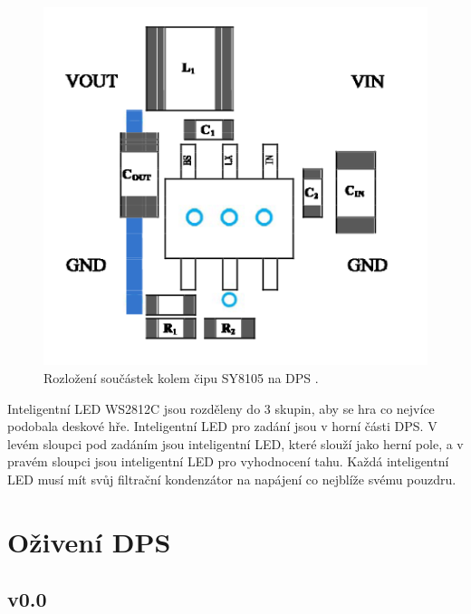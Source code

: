 \begin{figure}[!h]
  \begin{center}
    \includegraphics[scale=1]{obrazky/SY8105_rozlozeni_na_DPS.png}
  \end{center}
  \caption[Rozložení součástek kolem čipu SY8105 na DPS]{Rozložení součástek kolem čipu SY8105 na DPS \cite{SY8105_datasheet}.}
\end{figure}

Inteligentní LED WS2812C jsou rozděleny do 3 skupin, aby se hra co nejvíce podobala deskové hře. Inteligentní LED pro zadání 
jsou v horní části DPS. V levém sloupci pod zadáním jsou inteligentní LED, které slouží jako herní pole, a v pravém sloupci 
jsou inteligentní LED pro vyhodnocení tahu. Každá inteligentní LED musí mít svůj filtrační kondenzátor na napájení co nejblíže 
svému pouzdru.

\chapter{Oživení DPS}
\section{v0.0}

